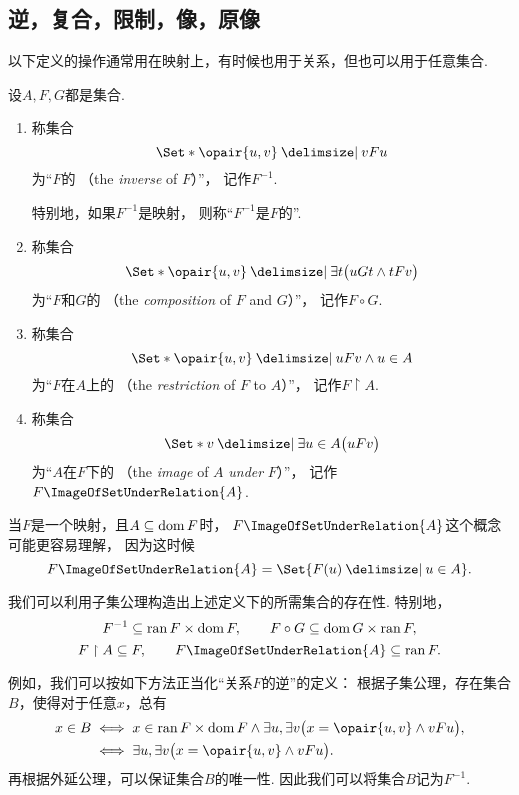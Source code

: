 \subsection{逆，复合，限制，像，原像}
以下定义的操作通常用在映射上，有时候也用于关系，但也可以用于任意集合.
\begin{definition}
设\(A,F,G\)都是集合.
\begin{enumerate}
	\item 称集合\[
		\Set*{ \opair{u,v} \given v F u }
	\]为“\(F\)的%
	（the \emph{inverse} of \(F\)）”，
	记作\(F^{-1}\).

	特别地，如果\(F^{-1}\)是映射，
	则称“\(F^{-1}\)是\(F\)的”.

	\item 称集合\[
		\Set*{ \opair{u,v} \given \exists t \bigl( u G t \land t F v \bigr) }
	\]为“\(F\)和\(G\)的%
	（the \emph{composition} of \(F\) and \(G\)）”，
	记作\(F \circ G\).

	\item 称集合\[
		\Set*{ \opair{u,v} \given u F v \land u \in A }
	\]为“\(F\)在\(A\)上的%
	（the \emph{restriction} of \(F\) to \(A\)）”，
	记作\(F \upharpoonright A\).

	\item 称集合\[
		\Set*{ v \given \exists u \in A \bigl( u F v \bigr) }
	\]为“\(A\)在\(F\)下的%
	（the \emph{image} of \(A\) \emph{under} \(F\)）”，
	记作\(F\ImageOfSetUnderRelation{A}\).
\end{enumerate}
\end{definition}

当\(F\)是一个映射，且\(A \subseteq \operatorname{dom} F\)时，
\(F\ImageOfSetUnderRelation{A}\)这个概念可能更容易理解，
因为这时候\[
	F\ImageOfSetUnderRelation{A}
	= \Set{ F(u) \given u \in A }.
\]

我们可以利用子集公理构造出上述定义下的所需集合的存在性.
特别地，\[
	F^{-1} \subseteq \operatorname{ran} F \times \operatorname{dom} F, \qquad
	F \circ G \subseteq \operatorname{dom} G \times \operatorname{ran} F,
\]\[
	F \upharpoonright A \subseteq F, \qquad
	F\ImageOfSetUnderRelation{A} \subseteq \ran F.
\]

例如，我们可以按如下方法正当化“关系\(F\)的逆”的定义：
根据子集公理，存在集合\(B\)，使得对于任意\(x\)，总有\begin{align*}
	x \in B
	&\iff
	x \in \ran F \times \dom F
	\land
	\exists u, \exists v \bigl( x = \opair{u,v} \land v F u \bigr), \\
	&\iff
	\exists u, \exists v \bigl( x = \opair{u,v} \land v F u \bigr).
\end{align*}
再根据外延公理，可以保证集合\(B\)的唯一性.
因此我们可以将集合\(B\)记为\(F^{-1}\).

